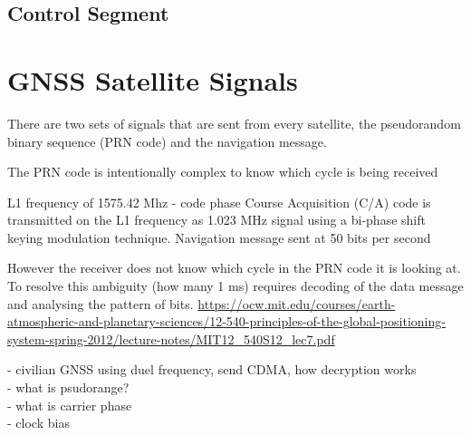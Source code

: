 \subsection{Control Segment}


\section{GNSS Satellite Signals}
There are two sets of signals that are sent from every satellite, the pseudorandom binary sequence (PRN code) and the navigation message. 

The PRN code is intentionally complex to know which cycle is being received

L1 frequency of 1575.42 Mhz  - code phase
Course Acquisition (C/A) code is transmitted on the L1 frequency as 1.023 MHz signal using a bi-phase shift keying modulation technique.
Navigation message sent at 50 bits per second  

However the receiver does not know which cycle in the PRN code it is looking at. To resolve this ambiguity (how many 1 ms) requires decoding of the data message and analysing the pattern of bits.
\url{https://ocw.mit.edu/courses/earth-atmospheric-and-planetary-sciences/12-540-principles-of-the-global-positioning-system-spring-2012/lecture-notes/MIT12_540S12_lec7.pdf}

- civilian GNSS using duel frequency, send CDMA, how decryption works\\
- what is psudorange?\\
- what is carrier phase\\
- clock bias\\




